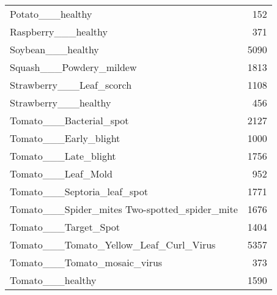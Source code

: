 \begin{tabular}{lr}
                                  Potato\_\_\_healthy &        152 \\
                               Raspberry\_\_\_healthy &        371 \\
                                 Soybean\_\_\_healthy &       5090 \\
                           Squash\_\_\_Powdery\_mildew &       1813 \\
                          Strawberry\_\_\_Leaf\_scorch &       1108 \\
                              Strawberry\_\_\_healthy &        456 \\
                           Tomato\_\_\_Bacterial\_spot &       2127 \\
                             Tomato\_\_\_Early\_blight &       1000 \\
                              Tomato\_\_\_Late\_blight &       1756 \\
                                Tomato\_\_\_Leaf\_Mold &        952 \\
                       Tomato\_\_\_Septoria\_leaf\_spot &       1771 \\
     Tomato\_\_\_Spider\_mites Two-spotted\_spider\_mite &       1676 \\
                              Tomato\_\_\_Target\_Spot &       1404 \\
            Tomato\_\_\_Tomato\_Yellow\_Leaf\_Curl\_Virus &       5357 \\
                      Tomato\_\_\_Tomato\_mosaic\_virus &        373 \\
                                  Tomato\_\_\_healthy &       1590 \\
\bottomrule
\end{tabular}

